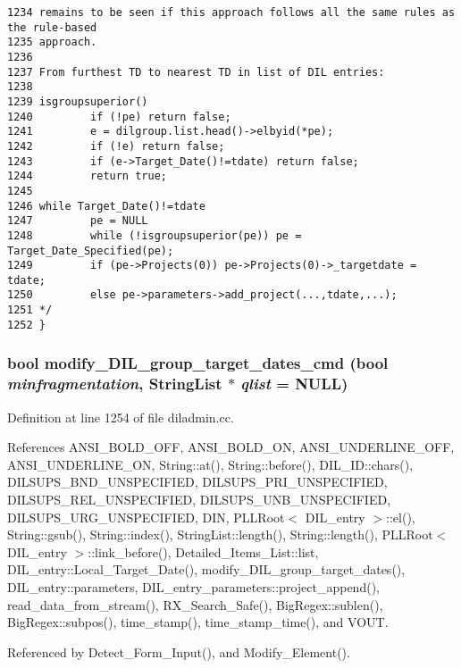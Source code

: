 \begin{verbatim}
1234 remains to be seen if this approach follows all the same rules as the rule-based
1235 approach.
1236 
1237 From furthest TD to nearest TD in list of DIL entries:
1238 
1239 isgroupsuperior()
1240         if (!pe) return false;
1241         e = dilgroup.list.head()->elbyid(*pe);
1242         if (!e) return false;
1243         if (e->Target_Date()!=tdate) return false;
1244         return true;
1245 
1246 while Target_Date()!=tdate
1247         pe = NULL
1248         while (!isgroupsuperior(pe)) pe = Target_Date_Specified(pe);
1249         if (pe->Projects(0)) pe->Projects(0)->_targetdate = tdate;
1250         else pe->parameters->add_project(...,tdate,...);
1251 */
1252 }
\end{verbatim}\normalsize 
{}
\subsubsection{\setlength{\rightskip}{0pt plus 5cm}bool modify\_\-DIL\_\-group\_\-target\_\-dates\_\-cmd (bool {\em minfragmentation}, {\bf String\-List} $\ast$ {\em qlist} = NULL)}\label{diladmin_8cc_a18}




Definition at line 1254 of file diladmin.cc.

References ANSI\_\-BOLD\_\-OFF, ANSI\_\-BOLD\_\-ON, ANSI\_\-UNDERLINE\_\-OFF, ANSI\_\-UNDERLINE\_\-ON, String::at(), String::before(), DIL\_\-ID::chars(), DILSUPS\_\-BND\_\-UNSPECIFIED, DILSUPS\_\-PRI\_\-UNSPECIFIED, DILSUPS\_\-REL\_\-UNSPECIFIED, DILSUPS\_\-UNB\_\-UNSPECIFIED, DILSUPS\_\-URG\_\-UNSPECIFIED, DIN, PLLRoot$<$ DIL\_\-entry $>$::el(), String::gsub(), String::index(), String\-List::length(), String::length(), PLLRoot$<$ DIL\_\-entry $>$::link\_\-before(), Detailed\_\-Items\_\-List::list, DIL\_\-entry::Local\_\-Target\_\-Date(), modify\_\-DIL\_\-group\_\-target\_\-dates(), DIL\_\-entry::parameters, DIL\_\-entry\_\-parameters::project\_\-append(), read\_\-data\_\-from\_\-stream(), RX\_\-Search\_\-Safe(), Big\-Regex::sublen(), Big\-Regex::subpos(), time\_\-stamp(), time\_\-stamp\_\-time(), and VOUT.

Referenced by Detect\_\-Form\_\-Input(), and Modify\_\-Element().



